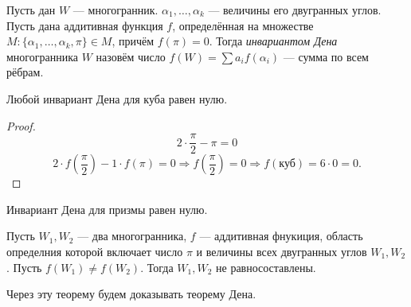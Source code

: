 \begin{definition}
    Пусть дан $W$ — многогранник. $\alpha_1, \dots, \alpha_k$ — величины его двугранных углов. Пусть дана аддитивная функция $f$, определённая на множестве $M: \{\alpha_1, \dots, \alpha_k, \pi\} \in M$, причём $f(\pi) = 0$. Тогда \textit{инвариантом Дена} многогранника $W$ назовём число $f(W) = \sum a_i f(\alpha_i)$ — сумма по всем рёбрам.
\end{definition}

\begin{statement}
    Любой инвариант Дена для куба равен нулю.
\end{statement}
\begin{proof}
    $$2 \cdot \frac{\pi}{2} - \pi = 0$$
    $$2 \cdot f \left(\frac{\pi}2\right) - 1 \cdot f(\pi) = 0 \Rightarrow f \left(\frac{\pi}2\right) = 0 \Rightarrow f(\text{куб}) = 6 \cdot 0 = 0.$$
\end{proof}

\begin{statement}
    Инвариант Дена для призмы равен нулю.
\end{statement}

\begin{theorem}[Хадвигер]
    Пусть $W_1, W_2$ — два многогранника, $f$ — аддитивная фнукиция, область определния которой включает число $\pi$ и величины всех двугранных углов $W_1, W_2$. Пусть $f(W_1) \neq f(W_2)$. Тогда $W_1, W_2$ не равносоставлены.
\end{theorem}

\begin{remark}
    Через эту теорему будем доказывать теорему Дена.
\end{remark}


